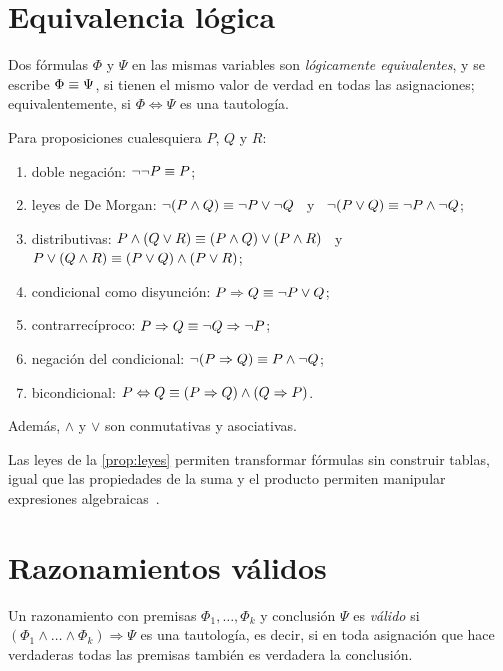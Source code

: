\section{Equivalencia lógica}

\begin{definicion}\label{def:equivalencia}
Dos fórmulas $\Phi$ y $\Psi$ en las mismas variables son \emph{lógicamente equivalentes}, y se escribe $\Phi\equiv\Psi$, si tienen el mismo valor de verdad en todas las asignaciones; equivalentemente, si $\Phi\Leftrightarrow\Psi$ es una tautología.
\end{definicion}

\begin{proposicion}\label{prop:leyes}
Para proposiciones cualesquiera $P$, $Q$ y $R$:
\begin{enumerate}
  \item doble negación: $\neg\neg P\equiv P$;
  \item leyes de De Morgan: $\neg(P\wedge Q)\equiv\neg P\vee\neg Q$ \ y \ $\neg(P\vee Q)\equiv\neg P\wedge\neg Q$;
  \item distributivas: $P\wedge(Q\vee R)\equiv(P\wedge Q)\vee(P\wedge R)$ \ y \ $P\vee(Q\wedge R)\equiv(P\vee Q)\wedge(P\vee R)$;
  \item condicional como disyunción: $P\Rightarrow Q\equiv\neg P\vee Q$;
  \item contrarrecíproco: $P\Rightarrow Q\equiv\neg Q\Rightarrow\neg P$;
  \item negación del condicional: $\neg(P\Rightarrow Q)\equiv P\wedge\neg Q$;
  \item bicondicional: $P\Leftrightarrow Q\equiv(P\Rightarrow Q)\wedge(Q\Rightarrow P)$.
\end{enumerate}
Además, $\wedge$ y $\vee$ son conmutativas y asociativas.
\end{proposicion}

Las leyes de la \cref{prop:leyes} permiten transformar fórmulas sin construir tablas, igual que las propiedades de la suma y el producto permiten manipular expresiones algebraicas~\cite[§3.4]{mcs}.

\addtocounter{definicion}{1}%

\section{Razonamientos válidos}\label{sec:inferencia}

\begin{definicion}
Un razonamiento con premisas $\Phi_1,\dots,\Phi_k$ y conclusión $\Psi$ es \emph{válido} si $(\Phi_1\wedge\dots\wedge\Phi_k)\Rightarrow\Psi$ es una tautología, es decir, si en toda asignación que hace verdaderas todas las premisas también es verdadera la conclusión.
\end{definicion}

